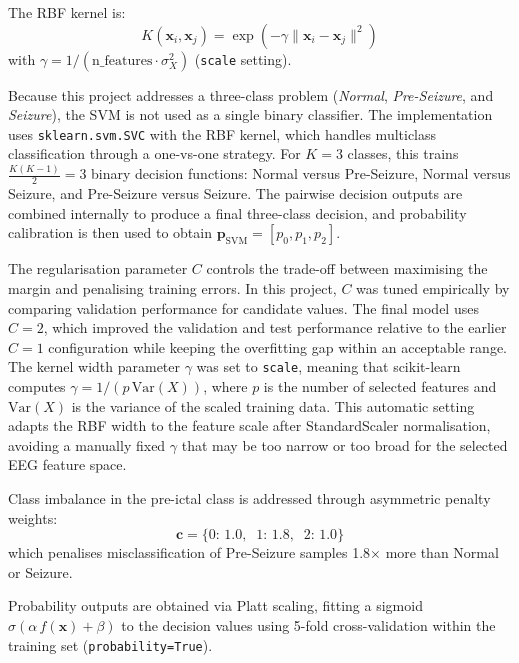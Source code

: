 \documentclass[12pt, a4paper]{report}
\begin{document}
The RBF kernel is:
\begin{equation}
  K(\mathbf{x}_i,\mathbf{x}_j) = \exp\!\left(-\gamma\|\mathbf{x}_i-\mathbf{x}_j\|^2\right)
  \label{eq:rbf}
\end{equation}
with $\gamma = 1/(\text{n\_features}\cdot\sigma^2_X)$ (\texttt{scale}
setting).

Because this project addresses a three-class problem
(\textit{Normal}, \textit{Pre-Seizure}, and \textit{Seizure}), the SVM is
not used as a single binary classifier. The implementation uses
\texttt{sklearn.svm.SVC} with the RBF kernel, which handles multiclass
classification through a one-vs-one strategy. For $K=3$ classes, this
trains $\frac{K(K-1)}{2}=3$ binary decision functions: Normal versus
Pre-Seizure, Normal versus Seizure, and Pre-Seizure versus Seizure. The
pairwise decision outputs are combined internally to produce a final
three-class decision, and probability calibration is then used to obtain
$\mathbf{p}_{\text{SVM}} = [p_0, p_1, p_2]$.

The regularisation parameter $C$ controls the trade-off between maximising
the margin and penalising training errors. In this project, $C$ was tuned
empirically by comparing validation performance for candidate values. The
final model uses $C=2$, which improved the validation and test performance
relative to the earlier $C=1$ configuration while keeping the overfitting
gap within an acceptable range. The kernel width parameter $\gamma$ was
set to \texttt{scale}, meaning that scikit-learn computes
$\gamma = 1/(p\,\mathrm{Var}(X))$, where $p$ is the number of selected
features and $\mathrm{Var}(X)$ is the variance of the scaled training
data. This automatic setting adapts the RBF width to the feature scale
after StandardScaler normalisation, avoiding a manually fixed $\gamma$
that may be too narrow or too broad for the selected EEG feature space.

Class imbalance in the pre-ictal class is addressed through asymmetric
penalty weights:
\begin{equation}
  \mathbf{c} = \{0:\,1.0,\;\; 1:\,1.8,\;\; 2:\,1.0\}
  \label{eq:classweight}
\end{equation}
which penalises misclassification of Pre-Seizure samples 1.8$\times$
more than Normal or Seizure.

Probability outputs are obtained via Platt scaling, fitting a sigmoid
$\sigma(\alpha\,f(\mathbf{x})+\beta)$ to the decision values using
5-fold cross-validation within the training set
(\texttt{probability=True}).
\end{document}
